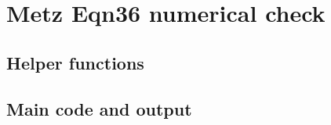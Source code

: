\documentclass[
]{book}
\begin{document}
\hypertarget{MetzEqn36}{%
\chapter{Metz Eqn36 numerical check}\label{MetzEqn36}}

\hypertarget{helper-functions-1}{%
\section{Helper functions}\label{helper-functions-1}}

\hypertarget{main-code-and-output-1}{%
\section{Main code and output}\label{main-code-and-output-1}}
\end{document}
